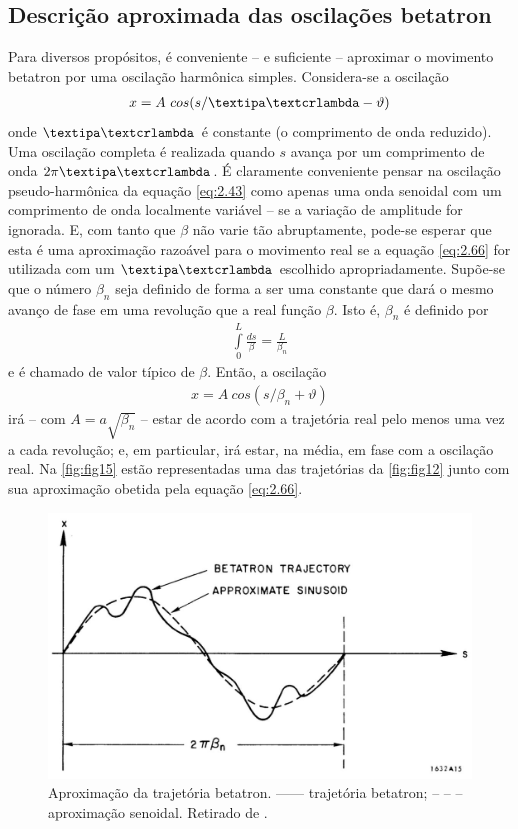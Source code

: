 \subsection{Descrição aproximada das oscilações betatron}\label{sec:2.8}
Para diversos propósitos, é conveniente -- e suficiente -- aproximar o movimento betatron por uma oscilação harmônica simples. Considera-se a oscilação
\begin{align}
	x = A\ cos(s/ \lambdabar - \vartheta)\label{eq:2.66}
\end{align}
onde $\lambdabar$ é constante (o comprimento de onda reduzido). Uma oscilação completa é realizada quando $s$ avança por um comprimento de onda $2\pi \lambdabar$. É claramente conveniente pensar na oscilação pseudo-harmônica da equação \eqref{eq:2.43} como apenas uma onda senoidal com um comprimento de onda localmente variável -- se a variação de amplitude for ignorada. E, com tanto que $\beta$ não varie tão abruptamente, pode-se esperar que esta é uma aproximação razoável para o movimento real se a equação \eqref{eq:2.66} for utilizada com um $\lambdabar$ escolhido apropriadamente. Supõe-se que o número $\beta_n$ seja definido de forma a ser uma constante que dará o mesmo avanço de fase em uma revolução que a real função $\beta$. Isto é, $\beta_n$ é definido por
\begin{align}
	\int\limits_{0}^{L} \frac{ds}{\beta} = \frac{L}{\beta_n}\label{eq:2.67}
\end{align}
e é chamado de valor típico de $\beta$. Então, a oscilação
\begin{align}
	x = A\ cos(s/\beta_n + \vartheta)\label{eq:2.68}
\end{align}
irá -- com $A=a\sqrt{\beta_n}$ -- estar de acordo com a trajetória real pelo menos uma vez a cada revolução; e, em particular, irá estar, na média, em fase com a oscilação real. Na \autoref{fig:fig15} estão representadas uma das trajetórias da \autoref{fig:fig12} junto com sua aproximação obetida pela equação \eqref{eq:2.66}.

\begin{figure}[!htb]
	\centering
	\includegraphics[width=0.7\linewidth]{./Figuras/fig15.jpeg}
	\caption{Aproximação da trajetória betatron.  ------ trajetória betatron; -- -- --  aproximação senoidal. Retirado de \cite{sands1970physics}.}
	\label{fig:fig15}
\end{figure}

